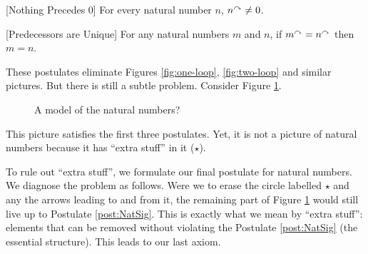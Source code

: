 \begin{postulate}\label{ax:NatZero}[Nothing Precedes $0$]
  For every natural number $n$, $n^\curvearrowright\neq 0$.
\end{postulate}

\begin{postulate}\label{ax:NatPred}[Predecessors are Unique]
  For any natural numbers $m$ and $n$, if $m^\curvearrowright=n^\curvearrowright$ then $m=n$.
\end{postulate}

These postulates eliminate Figures \ref{fig:one-loop}, \ref{fig:two-loop} and similar pictures.  
But there is still a subtle problem. 
Consider Figure \ref{fig:nonstandard}.

\begin{figure}[h]
  \centering
  \caption{A model of the natural numbers?}
  \label{fig:nonstandard}
\end{figure}

This picture satisfies the first three postulates. 
Yet, it is not a picture of natural numbers because it has ``extra stuff'' in it ($\star$).

\ipadbreak

To rule out ``extra stuff'', we formulate our final postulate for natural numbers.
We diagnose the problem as follows.
Were we to erase the circle labelled $\star$ and any the arrows leading to and from it, the remaining part of Figure \ref{fig:nonstandard} would still live up to Postulate \ref{post:NatSig}.
This is exactly what we mean by ``extra stuff'': 
elements that can be removed without violating the Postulate \ref{post:NatSig} (the essential structure). 
This leads to our last axiom. 

